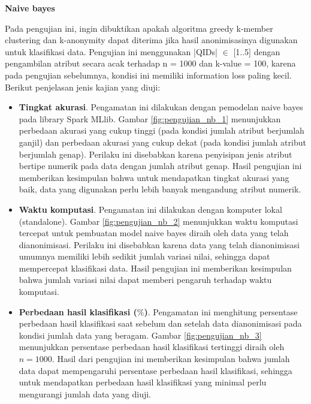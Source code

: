 \vspace{0.5cm}
\textbf{Naive bayes}\\

\begin{minipage}[t]{15.8cm}
Pada pengujian ini, ingin dibuktikan apakah algoritma greedy k-member clustering dan k-anonymity dapat diterima jika hasil anonimisasinya digunakan untuk klasifikasi data. Pengujian ini menggunakan |QIDs| $\in$ [1..5] dengan pengambilan atribut secara acak terhadap n = 1000  dan k-value = 100, karena pada pengujian sebelumnya, kondisi ini memiliki information loss paling kecil. Berikut penjelasan jenis kajian yang diuji:
\end{minipage}

\begin{itemize}

\item \textbf{Tingkat akurasi}. Pengamatan ini dilakukan dengan pemodelan naive bayes pada library Spark MLlib. Gambar \ref{fig:pengujian_nb_1} menunjukkan perbedaan akurasi yang cukup tinggi (pada kondisi jumlah atribut berjumlah ganjil) dan perbedaan akurasi yang cukup dekat (pada kondisi jumlah atribut berjumlah genap). Perilaku ini disebabkan karena penyisipan jenis atribut bertipe numerik pada data dengan jumlah atribut genap. Hasil pengujian ini memberikan kesimpulan bahwa untuk mendapatkan tingkat akurasi yang baik, data yang digunakan perlu lebih banyak mengandung atribut numerik.

\item \textbf{Waktu komputasi}. Pengamatan ini dilakukan dengan komputer lokal (standalone). Gambar \ref{fig:pengujian_nb_2} menunjukkan waktu komputasi tercepat untuk pembuatan model naive bayes diraih oleh data yang telah dianonimisasi. Perilaku ini disebabkan karena data yang telah dianonimisasi umumnya memiliki lebih sedikit jumlah variasi nilai, sehingga dapat mempercepat klasifikasi data. Hasil pengujian ini memberikan kesimpulan bahwa jumlah variasi nilai dapat memberi pengaruh terhadap waktu komputasi.

\newpage
\item \textbf{Perbedaan hasil klasifikasi ($\%$)}. Pengamatan ini menghitung persentase perbedaan hasil klasifikasi saat sebelum dan setelah data dianonimisasi pada kondisi jumlah data yang beragam. Gambar \ref{fig:pengujian_nb_3} menunjukkan persentase perbedaan hasil klasifikasi tertinggi diraih oleh $n=1000$. Hasil dari pengujian ini memberikan kesimpulan bahwa jumlah data dapat mempengaruhi persentase perbedaan hasil klasifikasi, sehingga untuk mendapatkan perbedaan hasil klasifikasi yang minimal perlu mengurangi jumlah data yang diuji.

\end{itemize}

